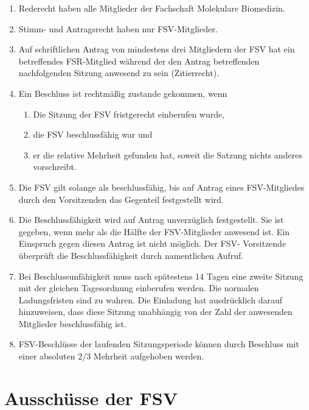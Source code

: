 \documentclass{article}
\providecommand{\tightlist}{\setlength{\itemsep}{0pt}\setlength{\parskip}{0pt}}
\begin{document}
\begin{enumerate}[(1)]
	\item Rederecht haben alle Mitglieder der Fachschaft Molekulare Biomedizin.
	\item Stimm- und Antragsrecht haben nur FSV-Mitglieder.
	\item Auf schriftlichen Antrag von mindestens drei Mitgliedern der FSV hat ein betreffendes FSR-Mitglied während der den Antrag betreffenden nachfolgenden Sitzung anwesend zu sein (Zitierrecht).
	\item Ein Beschluss ist rechtmäßig zustande gekommen, wenn
	\begin{enumerate}[1.]
		\tightlist
		\item Die Sitzung der FSV fristgerecht einberufen wurde,
		\item die FSV beschlussfähig war und
		\item er die relative Mehrheit gefunden hat, soweit die Satzung nichts anderes vorschreibt.
	\end{enumerate}
	\item Die FSV gilt solange als beschlussfähig, bis auf Antrag eines FSV-Mitgliedes durch den Vorsitzenden das Gegenteil festgestellt wird.
	\item Die Beschlussfähigkeit wird auf Antrag unverzüglich festgestellt. Sie ist gegeben, wenn mehr als die Hälfte der FSV-Mitglieder anwesend ist. Ein Einspruch gegen diesen Antrag ist nicht möglich. Der FSV- Vorsitzende überprüft die Beschlussfähigkeit durch namentlichen Aufruf.
	\item Bei Beschlussunfähigkeit muss nach spätestens 14 Tagen eine zweite Sitzung mit der gleichen Tagesordnung einberufen werden. Die normalen Ladungsfristen sind zu wahren. Die Einladung hat ausdrücklich darauf hinzuweisen, dass diese Sitzung unabhängig von der Zahl der anwesenden Mitglieder beschlussfähig ist.
	\item FSV-Beschlüsse der laufenden Sitzungsperiode können durch Beschluss mit einer absoluten 2/3 Mehrheit aufgehoben werden.
\end{enumerate}

\section{Ausschüsse der FSV}\label{ausschuxfcsse-der-fsv}
\end{document}
